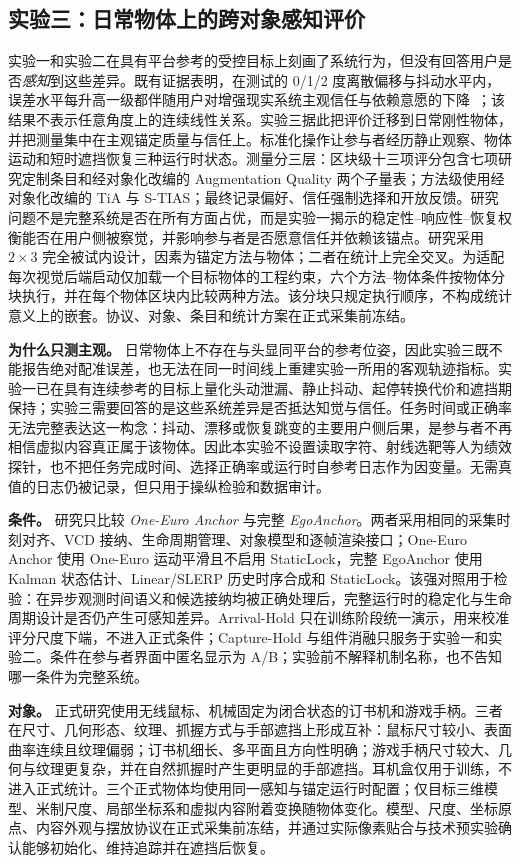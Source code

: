 \documentclass[review]{vgtc}
\begin{document}
\subsection{实验三：日常物体上的跨对象感知评价}

实验一和实验二在具有平台参考的受控目标上刻画了系统行为，但没有回答用户是否\emph{感知}到这些差异。既有证据表明，在测试的 0/1/2 度离散偏移与抖动水平内，误差水平每升高一级都伴随用户对增强现实系统主观信任与依赖意愿的下降~\cite{gottsacker2024artrust}；该结果不表示任意角度上的连续线性关系。实验三据此把评价迁移到日常刚性物体，并把测量集中在主观锚定质量与信任上。标准化操作让参与者经历静止观察、物体运动和短时遮挡恢复三种运行时状态。测量分三层：区块级十三项评分包含七项研究定制条目和经对象化改编的 Augmentation Quality 两个子量表；方法级使用经对象化改编的 TiA 与 S-TIAS；最终记录偏好、信任强制选择和开放反馈。研究问题不是完整系统是否在所有方面占优，而是实验一揭示的稳定性--响应性--恢复权衡能否在用户侧被察觉，并影响参与者是否愿意信任并依赖该锚点。研究采用 $2 \times 3$ 完全被试内设计，因素为锚定方法与物体；二者在统计上完全交叉。为适配每次视觉后端启动仅加载一个目标物体的工程约束，六个方法--物体条件按物体分块执行，并在每个物体区块内比较两种方法。该分块只规定执行顺序，不构成统计意义上的嵌套。协议、对象、条目和统计方案在正式采集前冻结。

\textbf{为什么只测主观。} 日常物体上不存在与头显同平台的参考位姿，因此实验三既不能报告绝对配准误差，也无法在同一时间线上重建实验一所用的客观轨迹指标。实验一已在具有连续参考的目标上量化头动泄漏、静止抖动、起停转换代价和遮挡期保持；实验三需要回答的是这些系统差异是否抵达知觉与信任。任务时间或正确率无法完整表达这一构念：抖动、漂移或恢复跳变的主要用户侧后果，是参与者不再相信虚拟内容真正属于该物体。因此本实验不设置读取字符、射线选靶等人为绩效探针，也不把任务完成时间、选择正确率或运行时自参考日志作为因变量。无需真值的日志仍被记录，但只用于操纵检验和数据审计。

\textbf{条件。} 研究只比较 \emph{One-Euro Anchor} 与完整 \emph{EgoAnchor}。两者采用相同的采集时刻对齐、VCD 接纳、生命周期管理、对象模型和逐帧渲染接口；One-Euro Anchor 使用 One-Euro 运动平滑且不启用 StaticLock，完整 EgoAnchor 使用 Kalman 状态估计、Linear/SLERP 历史时序合成和 StaticLock。该强对照用于检验：在异步观测时间语义和候选接纳均被正确处理后，完整运行时的稳定化与生命周期设计是否仍产生可感知差异。Arrival-Hold 只在训练阶段统一演示，用来校准评分尺度下端，不进入正式条件；Capture-Hold 与组件消融只服务于实验一和实验二。条件在参与者界面中匿名显示为 A/B；实验前不解释机制名称，也不告知哪一条件为完整系统。

\textbf{对象。} 正式研究使用无线鼠标、机械固定为闭合状态的订书机和游戏手柄。三者在尺寸、几何形态、纹理、抓握方式与手部遮挡上形成互补：鼠标尺寸较小、表面曲率连续且纹理偏弱；订书机细长、多平面且方向性明确；游戏手柄尺寸较大、几何与纹理更复杂，并在自然抓握时产生更明显的手部遮挡。耳机盒仅用于训练，不进入正式统计。三个正式物体均使用同一感知与锚定运行时配置；仅目标三维模型、米制尺度、局部坐标系和虚拟内容附着变换随物体变化。模型、尺度、坐标原点、内容外观与摆放协议在正式采集前冻结，并通过实际像素贴合与技术预实验确认能够初始化、维持追踪并在遮挡后恢复。
\end{document}
